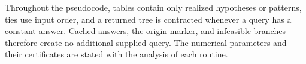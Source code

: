Throughout the pseudocode, tables contain only realized hypotheses or
patterns, ties use input order, and a returned tree is contracted whenever
a query has a constant answer. Cached answers, the origin marker, and
infeasible branches therefore create no additional supplied query. The
numerical parameters and their certificates are stated with the analysis
of each routine.

